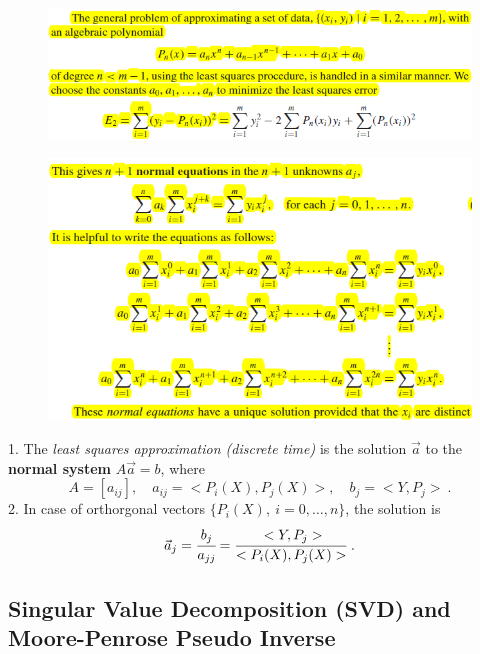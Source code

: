 \documentclass[12pt]{article}
\theoremstyle{theorem}
\begin{document}
\begin{figure}[h!]
	\centering
	\includegraphics[scale = 0.8]{Figures/32}	
\end{figure}

\begin{figure}[h!]
	\centering
	\includegraphics[scale = 0.8]{Figures/33}
\end{figure}

\begin{shaded}
1.	The \emph{least squares approximation (discrete time)} is the solution $\vec{a}$ to the \textbf{normal system} $A \vec{a} = b$, where
	\begin{equation*}
	A = [a_{ij}], \quad a_{ij} = <P_i(X),P_j(X)>, \quad b_j = <Y,P_j> \ .
	\end{equation*}  
2.	In case of orthorgonal vectors $\{P_i(X), \ i=0,\dots,n\}$, the solution is 
    \[ \vec{a}_j = \cfrac{b_j}{a_{jj}} = \cfrac{<Y,P_j>}{<P_i(X),P_j(X)>} \ . \]
\end{shaded}

\subsection{Singular Value Decomposition (SVD) and Moore-Penrose Pseudo Inverse}
\end{document}
